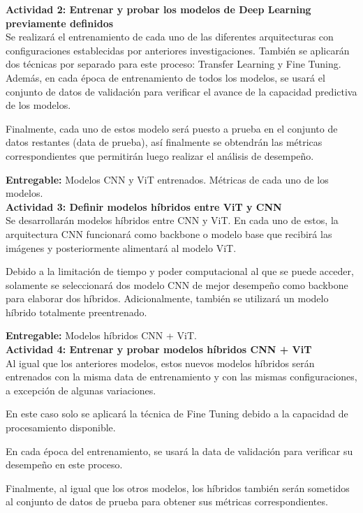 \textbf{Actividad 2: Entrenar y probar los modelos de Deep Learning previamente definidos}
\\
Se realizará el entrenamiento de cada uno de las diferentes arquitecturas con configuraciones establecidas por anteriores investigaciones. También se aplicarán dos técnicas por separado para este proceso: Transfer Learning y Fine Tuning. Además, en cada época de entrenamiento de todos los modelos, se usará el conjunto de datos de validación para verificar el avance de la capacidad predictiva de los modelos.

Finalmente, cada uno de estos modelo será puesto a prueba en el conjunto de datos restantes (data de prueba), así finalmente se obtendrán las métricas correspondientes que permitirán luego realizar el análisis de desempeño.

\textbf{Entregable:} Modelos CNN y ViT entrenados. Métricas de cada uno de los modelos.
\\

\textbf{Actividad 3:  Definir modelos híbridos entre ViT y CNN}
\\
Se desarrollarán modelos híbridos entre CNN y ViT. En cada uno de estos, la arquitectura CNN funcionará como backbone o modelo base que recibirá las imágenes y posteriormente alimentará al modelo ViT.

Debido a la limitación de tiempo y poder computacional al que se puede acceder, solamente se seleccionará dos modelo CNN de mejor desempeño como backbone para elaborar dos híbridos. Adicionalmente, también se utilizará un modelo híbrido totalmente preentrenado.

\textbf{Entregable:} Modelos híbridos CNN + ViT.
\\

\textbf{Actividad 4: Entrenar y probar modelos híbridos CNN + ViT}
\\
Al igual que los anteriores modelos, estos nuevos modelos híbridos serán entrenados con la misma data de entrenamiento y con las mismas configuraciones, a excepción de algunas variaciones.

En este caso solo se aplicará la técnica de Fine Tuning debido a la capacidad de procesamiento disponible.

En cada época del entrenamiento, se usará la data de validación para verificar su desempeño en este proceso.

Finalmente, al igual que los otros modelos, los híbridos también serán sometidos al conjunto de datos de prueba para obtener sus métricas correspondientes.

